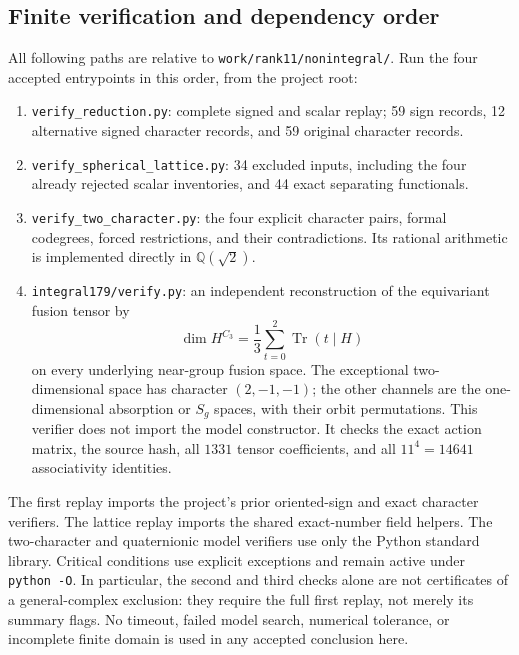 \subsection{Finite verification and dependency order}
\label{subsec:r11-nonintegral-replay}

All following paths are relative to \texttt{work/rank11/nonintegral/}.
Run the four accepted entrypoints in this order, from the project root:
\begin{enumerate}
\item \nolinkurl{verify_reduction.py}: complete signed and scalar replay;
59 sign records, 12 alternative signed character records, and
59 original character records.
\item \nolinkurl{verify_spherical_lattice.py}: 34 excluded inputs,
including the four already rejected scalar inventories, and
44 exact separating functionals.
\item \nolinkurl{verify_two_character.py}: the four explicit character
pairs, formal codegrees, forced restrictions, and their contradictions.
Its rational arithmetic is implemented directly in $\mathbb Q(\sqrt2)$.
\item \nolinkurl{integral179/verify.py}: an independent reconstruction of
the equivariant fusion tensor by
\[
 \dim H^{C_3}=\frac13\sum_{t=0}^2\operatorname{Tr}(t\mid H)
\]
on every underlying near-group fusion space. The exceptional
two-dimensional space has character $(2,-1,-1)$; the other channels
are the one-dimensional absorption or $S_g$ spaces, with their orbit
permutations. This verifier does not import the model constructor.
It checks the exact action matrix, the source hash, all $1331$ tensor
coefficients, and all $11^4=14641$ associativity identities.
\end{enumerate}

The first replay imports the project's prior oriented-sign and exact
character verifiers. The lattice replay imports the shared exact-number
field helpers. The two-character and quaternionic model verifiers use
only the Python standard library. Critical conditions use explicit
exceptions and remain active under \texttt{python -O}. In particular,
the second and third checks alone are not certificates of a
general-complex exclusion: they require the full first replay, not merely
its summary flags. No timeout, failed model search, numerical tolerance,
or incomplete finite domain is used in any accepted conclusion here.
